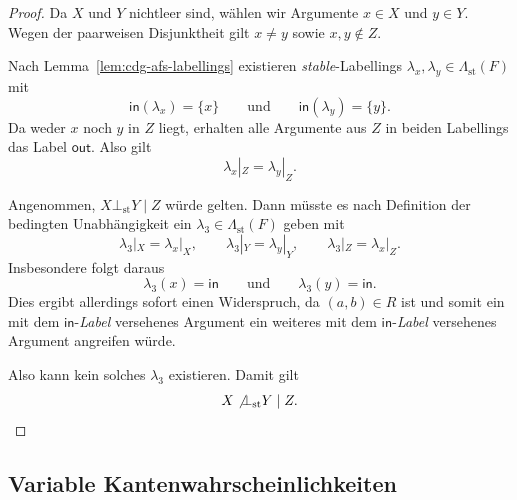 \begin{proof}
    Da \(X\) und \(Y\) nichtleer sind, wählen wir Argumente
    \(x\in X\) und \(y\in Y\). Wegen der paarweisen Disjunktheit gilt
    \(x\neq y\) sowie \(x,y\notin Z\).

    Nach Lemma~\ref{lem:cdg-afs-labellings} existieren
    \textit{stable}-Labellings \(\lambda_x,\lambda_y\in
    \Lambda_{\mathrm{st}}(F)\) mit
    \[
        \mathsf{in}(\lambda_x)=\{x\}
        \qquad\text{und}\qquad
        \mathsf{in}(\lambda_y)=\{y\}.
    \]
    Da weder \(x\) noch \(y\) in \(Z\) liegt, erhalten alle Argumente aus
    \(Z\) in beiden Labellings das Label \(\mathsf{out}\). Also gilt
    \[
        \lambda_x|_Z=\lambda_y|_Z.
    \]

    Angenommen, \(X\bot_{\mathrm{st}}Y\mid Z\) würde gelten. Dann müsste es
    nach Definition der bedingten Unabhängigkeit ein
    \(\lambda_3\in\Lambda_{\mathrm{st}}(F)\) geben mit
    \[
        \lambda_3|_X=\lambda_x|_X,
        \qquad
        \lambda_3|_Y=\lambda_y|_Y,
        \qquad
        \lambda_3|_Z=\lambda_x|_Z.
    \]
    Insbesondere folgt daraus
    \[
        \lambda_3(x)=\mathsf{in}
        \qquad\text{und}\qquad
        \lambda_3(y)=\mathsf{in}.
    \]
    Dies ergibt allerdings sofort einen Widerspruch, da \((a,b) \in R\) ist und somit ein mit dem \(\mathsf{in}\)-\emph{Label} versehenes Argument ein weiteres mit
    dem \(\mathsf{in}\)-\emph{Label} versehenes Argument angreifen würde.  

    Also kann kein solches \(\lambda_3\) existieren. Damit gilt
    \[
        X\not\bot_{\mathrm{st}}Y\mid Z.
    \]
\end{proof}

\subsection{Variable Kantenwahrscheinlichkeiten}

